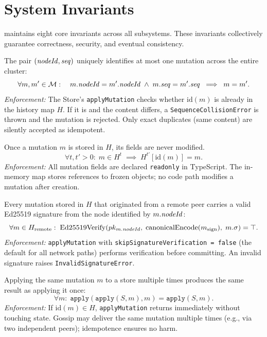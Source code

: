 \section{System Invariants}
\label{sec:invariants}

\pebble{} maintains eight core invariants across all subsystems. These
invariants collectively guarantee correctness, security, and eventual
consistency.

\begin{invariant}
\label{inv:uniqueness}
The pair $(\mathit{nodeId}, \mathit{seq})$ uniquely identifies at most one mutation across the
entire cluster:
\[
  \forall m, m' \in \mathcal{M}:\quad
  m.\mathit{nodeId} = m'.\mathit{nodeId} \;\land\; m.\mathit{seq} = m'.\mathit{seq}
  \;\implies\; m = m'.
\]
\textit{Enforcement:} The Store's \texttt{applyMutation} checks whether $\mathrm{id}(m)$
is already in the history map $H$. If it is and the content differs, a
\texttt{SequenceCollisionError} is thrown and the mutation is rejected. Only
exact duplicates (same content) are silently accepted as idempotent.
\end{invariant}

\begin{invariant}[Immutability]
\label{inv:immutability}
Once a mutation $m$ is stored in $H$, its fields are never modified.
\[
  \forall t, t' > 0:\; m \in H^t \;\implies\; H^{t'}[\mathrm{id}(m)] = m.
\]
\textit{Enforcement:} All mutation fields are declared \texttt{readonly} in
TypeScript. The in-memory map stores references to frozen objects; no code path
modifies a mutation after creation.
\end{invariant}

\begin{invariant}[Authenticity]
\label{inv:authenticity}
Every mutation stored in $H$ that originated from a remote peer carries a valid
Ed25519 signature from the node identified by $m.\mathit{nodeId}$:
\[
  \forall m \in H_{\mathrm{remote}}:\;
  \mathrm{Ed25519Verify}(pk_{m.\mathit{nodeId}},\;
  \mathrm{canonicalEncode}(m_{\text{sign}}),\; m.\sigma) = \top.
\]
\textit{Enforcement:} \texttt{applyMutation} with
\texttt{skipSignatureVerification~=~false} (the default for all network paths)
performs verification before committing. An invalid signature raises
\texttt{InvalidSignatureError}.
\end{invariant}

\begin{invariant}[Idempotence]
\label{inv:idempotence}
Applying the same mutation $m$ to a store multiple times produces the same
result as applying it once:
\[
  \forall m:\; \texttt{apply}(\texttt{apply}(S, m), m) = \texttt{apply}(S, m).
\]
\textit{Enforcement:} If $\mathrm{id}(m) \in H$, \texttt{applyMutation}
returns immediately without touching state. Gossip may deliver the same
mutation multiple times (e.g., via two independent peers); idempotence ensures
no harm.
\end{invariant}

